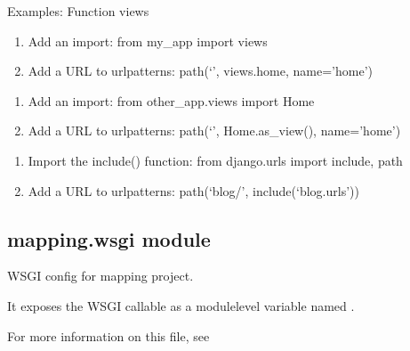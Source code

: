\documentclass[letterpaper,10pt,english]{sphinxmanual}
\begin{document}
\sphinxAtStartPar
Examples:
Function views
\begin{enumerate}
%
\item {} 
\sphinxAtStartPar
Add an import:  from my\_app import views

\item {} 
\sphinxAtStartPar
Add a URL to urlpatterns:  path(‘’, views.home, name=’home’)

\end{enumerate}
\begin{description}
\begin{enumerate}
%
\item {} 
\sphinxAtStartPar
Add an import:  from other\_app.views import Home

\item {} 
\sphinxAtStartPar
Add a URL to urlpatterns:  path(‘’, Home.as\_view(), name=’home’)

\end{enumerate}

\begin{enumerate}
%
\item {} 
\sphinxAtStartPar
Import the include() function: from django.urls import include, path

\item {} 
\sphinxAtStartPar
Add a URL to urlpatterns:  path(‘blog/’, include(‘blog.urls’))

\end{enumerate}

\end{description}


\subsection{mapping.wsgi module}
\label{\detokenize{mapping:module-mapping.wsgi}}\label{\detokenize{mapping:mapping-wsgi-module}}
\sphinxAtStartPar
WSGI config for mapping project.

\sphinxAtStartPar
It exposes the WSGI callable as a module\sphinxhyphen{}level variable named .

\sphinxAtStartPar
For more information on this file, see
\end{document}

